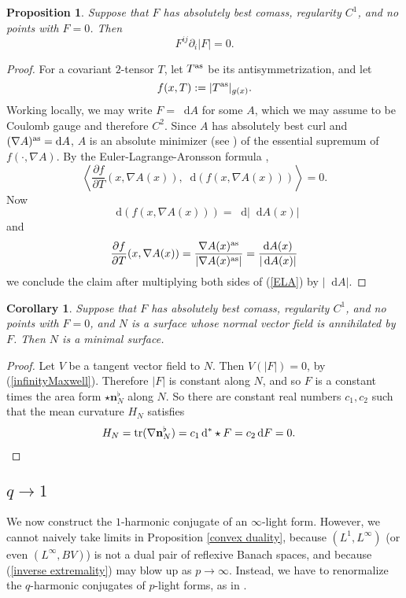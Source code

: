 \documentclass[reqno,11pt]{amsart}
\newcommand*\dif{\mathop{}\!\mathrm{d}}
\DeclareMathOperator{\tr}{tr}
\newcommand{\normal}{\mathbf n}
\newtheorem{proposition}[theorem]{Proposition}
\newtheorem{corollary}[theorem]{Corollary}
\theoremstyle{definition}
\numberwithin{equation}{section}
\begin{document}
\begin{proposition}
Suppose that $F$ has absolutely best comass, regularity $C^1$, and no points with $F = 0$. Then
\begin{equation}\label{infinityMaxwell}
	F^{ij} \partial_i |F| = 0.
\end{equation}
\end{proposition}
\begin{proof}
For a covariant $2$-tensor $T$, let $T^{\rm as}$ be its antisymmetrization, and let
$$f(x, T) := |T^{\rm as}|_{g(x)}.$$
Working locally, we may write $F = \dif A$ for some $A$, which we may assume to be Coulomb gauge and therefore $C^2$.
Since $A$ has absolutely best curl and $(\nabla A)^{\rm as} = \dif A$, $A$ is an absolute minimizer (see \cite[Definition 5.1]{Barron2001}) of the essential supremum of $f(\cdot, \nabla A)$.
By the Euler-Lagrange-Aronsson formula \cite[Theorem 5.2]{Barron2001},
\begin{equation}\label{ELA}
	\left\langle \frac{\partial f}{\partial T}(x, \nabla A(x)), \dif (f(x, \nabla A(x))) \right\rangle = 0.
\end{equation}
Now
$$\dif(f(x, \nabla A(x))) = \dif |\dif A(x)|$$
and 
$$\frac{\partial f}{\partial T}(x, \nabla A(x)) = \frac{\nabla A(x)^{\rm as}}{|\nabla A(x)^{\rm as}|} = \frac{\dif A(x)}{|\dif A(x)|}$$
we conclude the claim after multiplying both sides of (\ref{ELA}) by $|\dif A|$.
\end{proof}

\begin{corollary}
Suppose that $F$ has absolutely best comass, regularity $C^1$, and no points with $F = 0$, and $N$ is a surface whose normal vector field is annihilated by $F$.
Then $N$ is a minimal surface.
\end{corollary}
\begin{proof}
Let $V$ be a tangent vector field to $N$. Then $V(|F|) = 0$, by (\ref{infinityMaxwell}).
Therefore $|F|$ is constant along $N$, and so $F$ is a constant times the area form $\star \normal_N^\flat$ along $N$.
So there are constant real numbers $c_1, c_2$ such that the mean curvature $H_N$ satisfies
\begin{align*}
H_N &= \tr(\nabla \normal_N^\flat) = c_1 \dif^* \star F = c_2 \dif F = 0. \qedhere
\end{align*}
\end{proof}


\subsection{\texorpdfstring{$q \to 1$}{The limit as q goes to 1}}
We now construct the $1$-harmonic conjugate of an $\infty$-light form.
However, we cannot naively take limits in Proposition \ref{convex duality}, because $(L^1, L^\infty)$ (or even $(L^\infty, BV)$) is not a dual pair of reflexive Banach spaces, and because (\ref{inverse extremality}) may blow up as $p \to \infty$.
Instead, we have to renormalize the $q$-harmonic conjugates of $p$-light forms, as in \cite[\S3.2]{daskalopoulos2020transverse}.
\end{document}
